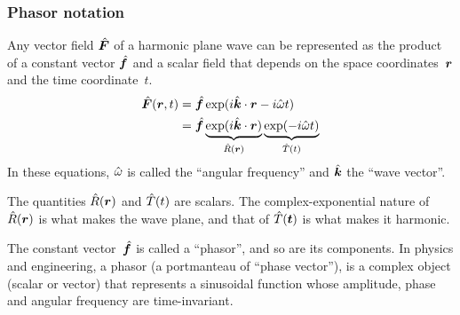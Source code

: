 \subsubsection{Phasor notation}
\label{sec:phasor_notation}
Any vector field $\hat{\bm{F}}$ of a harmonic plane wave can be represented as the product of a constant vector $\hat{\bm{f}}$ and a scalar field that depends on the space coordinates~$\bm{r}$ and the time coordinate~$t$.
\begin{subequations}
    \label{eq:harmonic_plane_field}
    \begin{align}
        \hat{\bm{F}}(\bm{r}, t)
        &= \hat{\bm{f}} \exp(i \hat{\bm{k}} \cdot \bm{r} - i \hat{\omega} t)
        \\
        &= \hat{\bm{f}}
        \underbrace{\exp(i \hat{\bm{k}} \cdot \bm{r})}_{\hat{R}(\bm{r})}
        \underbrace{\exp(- i \hat{\omega} t)}_{\hat{T}(t)}
    \end{align}
\end{subequations}
In these equations, $\hat{\omega}$ is called the ``angular frequency''
and $\hat{\bm{k}}$ the ``wave vector''.

The quantities $\hat{R}(\bm{r})$ and $\hat{T}(t)$ are scalars.
The complex-exponential nature of $\hat{R}(\bm{r})$ is what makes the wave plane,
and that of $\hat{T}(\bm{t})$ is what makes it harmonic.

The constant vector~$\hat{\bm{f}}$ is called a ``phasor'', and so are its components.
In physics and engineering, a phasor (a portmanteau of ``phase vector''),
is a complex object (scalar or vector) that represents a sinusoidal function whose amplitude, phase and angular frequency are time-invariant.

